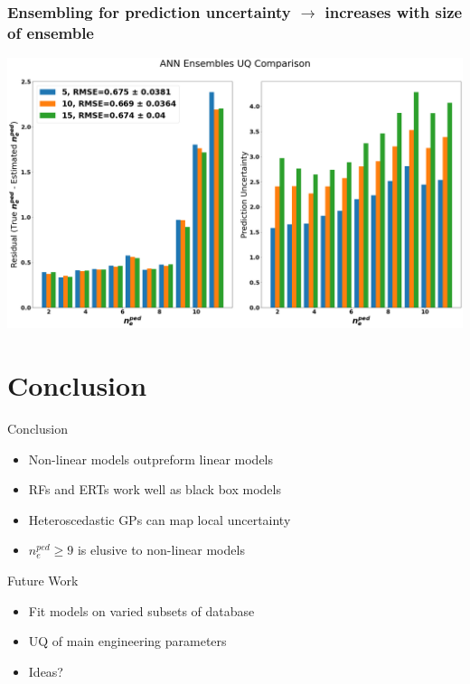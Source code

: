 \documentclass{beamer}
\begin{document}
\begin{frame}
\frametitle{Ensembling for prediction uncertainty $\rightarrow$ increases with size of ensemble}
\includegraphics[scale=0.18]{./src/ANN_ensemble_comp}
\end{frame}

\section{Conclusion}
\begin{frame}
\begin{block}{Conclusion}
	\begin{itemize}
		\item Non-linear models outpreform linear models 
		\item RFs and ERTs work well as black box models
		\item Heteroscedastic GPs can map local uncertainty
		\item $n_e^{ped} \geq 9$ is elusive to non-linear models
	\end{itemize}
	\end{block}
	\begin{block}{Future Work}
		\begin{itemize}
			\item Fit models on varied subsets of database
			\item UQ of main engineering parameters
			\item Ideas? 
		\end{itemize}
	\end{block}
\end{frame}
\end{document}
